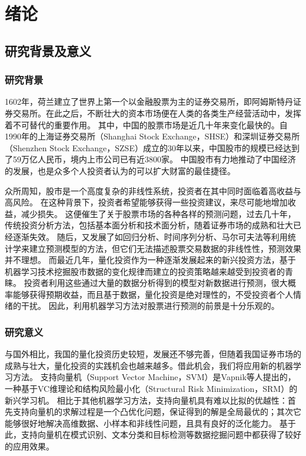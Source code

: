 
\chapter{绪论}

\section{研究背景及意义}

\subsection{研究背景}

1602年，荷兰建立了世界上第一个以金融股票为主的证券交易所，即阿姆斯特丹证券交易所。在此之后，不断壮大的资本市场便在人类的各类生产经营活动中，发挥着不可替代的重要作用。
其中，中国的股票市场是近几十年来变化最快的。自1990年的上海证券交易所（Shanghai Stock Exchange，SHSE）和深圳证券交易所（Shenzhen Stock Exchange，SZSE）成立的30年以来，中国股市的规模已经达到了59万亿人民币，境内上市公司已有近3800家。
中国股市有力地推动了中国经济的发展，也是众多个人投资者认为的可以扩大财富的最佳捷径。

众所周知，股市是一个高度复杂的非线性系统，投资者在其中同时面临着高收益与高风险。
在这种背景下，投资者希望能够获得一些投资建议，来尽可能地增加收益，减少损失。
这便催生了关于股票市场的各种各样的预测问题，过去几十年，传统投资分析方法，包括基本面分析\cite{cn1}和技术面分析\cite{cn2}，随着证券市场的成熟和壮大已经逐渐失效。
随后，又发展了如回归分析、时间序列分析\cite{cn3}、马尔可夫法\cite{cn4}等利用统计学来建立预测模型的方法，但它们无法描述股票交易数据的非线性性，预测效果并不理想。
而最近几年，量化投资作为一种逐渐发展起来的新兴投资方法，基于机器学习技术挖掘股市数据的变化规律而建立的投资策略越来越受到投资者的青睐。
投资者利用这些通过大量的数据分析得到的模型对新数据进行预测，很大概率能够获得预期收益，而且基于数据，量化投资是绝对理性的，不受投资者个人情绪的干扰。
因此，利用机器学习方法对股票进行预测的前景是十分乐观的。

\subsection{研究意义}

与国外相比，我国的量化投资历史较短，发展还不够完善，但随着我国证券市场的成熟与壮大，量化投资的实践机会也越来越多。借此机会，我们将应用新的机器学习方法。
支持向量机（Support Vector Machine，SVM）是Vapnik等人提出的，一种基于VC维理论和结构风险最小化（Structural Risk Minimization，SRM）的新兴学习机\cite{en1}。
相比于其他机器学习方法，支持向量机具有难以比拟的优越性：首先支持向量机的求解过程是一个凸优化问题，保证得到的解是全局最优的；其次它能够很好地解决高维数据、小样本和非线性问题，且具有良好的泛化能力。
基于此，支持向量机在模式识别、文本分类和目标检测等数据挖掘问题中都获得了较好的应用效果。

